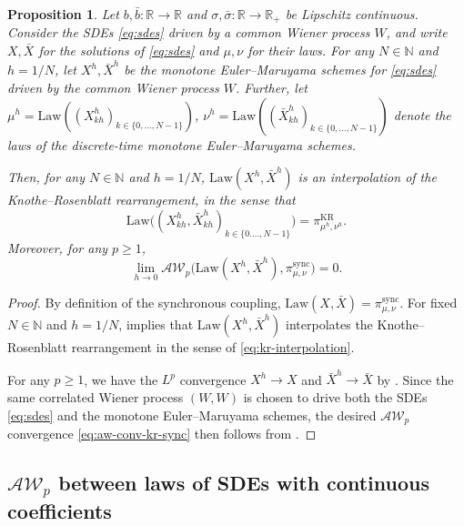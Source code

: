 \documentclass[oneside]{amsart}
\newtheorem{proposition}[theorem]{Proposition}
\theoremstyle{definition}
\newcommand{\AW}{\mathcal A\mathcal W}
\newcommand{\Law}{\mathrm{Law}}
\newcommand{\N}{\mathbb N}
\newcommand{\R}{\mathbb R}
\newcommand{\kr}{\mathrm{KR}}
\newcommand{\sync}{\mathrm{sync}}
\def\R{{\mathbb R}}
\numberwithin{equation}{section}
\begin{document}
\begin{proposition}\label{prop:aw-conv-kr-sync}
   Let $b, \bar{b}\colon \R \to \R$ and $\sigma, \bar{\sigma}\colon \R \to \R_+$ be Lipschitz continuous.
   Consider the SDEs \eqref{eq:sdes} driven by a common Wiener process $W$, and write $X, \bar X$ for the solutions of \eqref{eq:sdes} and $\mu, \nu$ for their laws. For any $N \in \N$ and $h = 1/N$, let $X^h, \bar X^h$ be the monotone Euler--Maruyama schemes for \eqref{eq:sdes} driven by the common Wiener process $W$. Further, let $\mu^h = \Law((X^h_{kh})_{k \in \{0, \dotsc, N - 1\}})$, $\nu^h = \Law((\bar X^h_{kh})_{k \in \{0, \dotsc, N - 1\}})$ denote the laws of the discrete-time monotone Euler--Maruyama schemes.
   
   Then, for any $N \in \N$ and $h = 1/N$, $\Law(X^h, \bar X^h)$ is an interpolation of the Knothe--Rosenblatt rearrangement, in the sense that
    \begin{equation}\label{eq:kr-interpolation}
        \Law\big((X^h_{kh}, \bar X^h_{kh})_{k \in \{0. \dotsc, N - 1\}}\big) = \pi^\kr_{\mu^h, \nu^h}.
    \end{equation}
    Moreover, for any $p \geq 1$,
    \begin{equation}\label{eq:aw-conv-kr-sync}
        \lim_{h \to 0}\AW_p\big(\Law(X^h, \bar X^h), \pi^\sync_{\mu, \nu}\big) = 0.
    \end{equation}
\end{proposition}

\begin{proof}
    By definition of the synchronous coupling, $\Law(X, \bar X) = \pi^\sync_{\mu, \nu}$. For fixed $N \in \N$ and $h = 1/N$,  implies that $\Law(X^h, \bar X^h)$ interpolates the Knothe--Rosenblatt rearrangement in the sense of \eqref{eq:kr-interpolation}.

    For any $p \geq 1$, we have the $L^p$ convergence $X^h \to X$ and $\bar X^h \to \bar X$ by . Since the same correlated Wiener process $(W, W)$ is chosen to drive both the SDEs \eqref{eq:sdes} and the monotone Euler--Maruyama schemes, the desired $\AW_p$ convergence \eqref{eq:aw-conv-kr-sync} then follows from .
\end{proof}

\subsection{$\AW_p$ between laws of SDEs with continuous coefficients}\label{sec:continuous-general}
\end{document}
